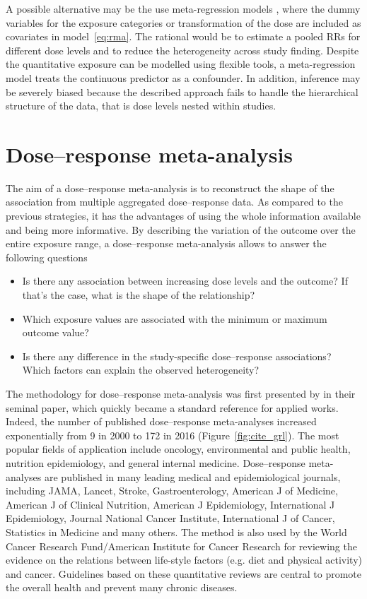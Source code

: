 \documentclass[11pt,a4paper,twoside,openany]{book}\usepackage{knitr}
\begin{document}
{A possible alternative may be the use meta-regression models \cite{berkey1995random}, where the dummy variables for the exposure categories or transformation of the dose are included as covariates in model~\ref{eq:rma}. The rational would be to estimate a pooled RRs for different dose levels and to reduce the heterogeneity across study finding. Despite the quantitative exposure can be modelled using flexible tools, a meta-regression model treats the continuous predictor as a confounder. In addition, inference may be severely biased because the described approach fails to handle the hierarchical structure of the data, that is dose levels nested within studies.



\section{Dose--response meta-analysis}

The aim of a dose--response meta-analysis is to reconstruct the shape of the association from multiple aggregated dose--response data. As compared to the previous strategies, it has the advantages of using the whole information available and being more informative. By describing the variation of the outcome over the entire exposure range, a dose--response meta-analysis allows to answer the following questions
\begin{itemize}
\item Is there any association between increasing dose levels and the outcome? If that’s the case, what is the shape of the relationship?
\item Which exposure values are associated with the minimum or maximum outcome value?
\item Is there any difference in the study-specific dose--response associations? Which factors can explain the observed heterogeneity?
\end{itemize}

\noindent The methodology for dose--response meta-analysis was first presented by \cite{greenland1992methods} in their seminal paper, which quickly became a standard reference for applied works. Indeed, the number of published dose--response meta-analyses increased exponentially from 9 in 2000 to 172 in 2016 (Figure~\ref{fig:cite_grl}).
The most popular fields of application include oncology, environmental and public health, nutrition epidemiology, and general internal medicine. Dose--response meta-analyses are published in many leading medical and epidemiological journals, including JAMA, Lancet, Stroke, Gastroenterology, American J of Medicine, American J of Clinical Nutrition, American J Epidemiology, International J Epidemiology, Journal National Cancer Institute, International J of Cancer, Statistics in Medicine and many others. The method is also used by the World Cancer Research Fund/American Institute for Cancer Research for reviewing the evidence on the relations between life-style factors (e.g. diet and physical activity) and cancer. Guidelines based on these quantitative reviews are central to promote the overall health and prevent many chronic diseases.

}
\end{document}
